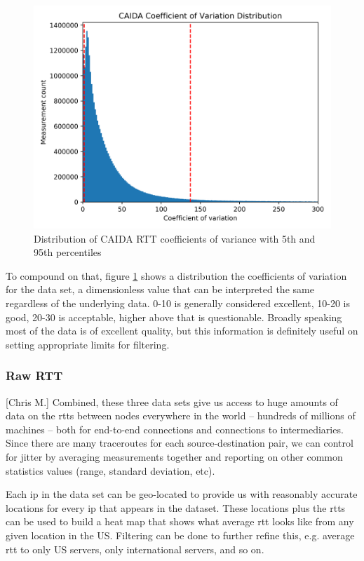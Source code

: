 \documentclass[12pt]{article}
\begin{document}
\begin{figure}[H]
    \centering
    \includegraphics[width=\textwidth]{images/CAIDA_cv_dist.png}
    \caption{Distribution of CAIDA RTT coefficients of variance with 5th and 95th percentiles} 
    \label{fig:rtt_cv_dst}
\end{figure}

To compound on that, figure \ref{fig:rtt_cv_dst} shows a distribution the coefficients of variation for the data set, a dimensionless value that can be interpreted the same regardless of the underlying data. 0-10 is generally considered excellent, 10-20 is good, 20-30 is acceptable, higher above that is questionable. Broadly speaking most of the data is of excellent quality, but this information is definitely useful on setting appropriate limits for filtering.

\subsubsection{Raw RTT}[Chris M.]
Combined, these three data sets give us access to huge amounts of data on the \acrshort{rtt}s between nodes everywhere in the world -- hundreds of millions of machines -- both for end-to-end connections and connections to intermediaries. Since there are many traceroutes for each source-destination pair, we can control for jitter by averaging measurements together and reporting on other common statistics values (range, standard deviation, etc).

Each \acrshort{ip} in the data set can be geo-located to provide us with reasonably accurate locations for every \acrshort{ip} that appears in the dataset. These locations plus the \acrshort{rtt}s can be used to build a heat map that shows what average \acrshort{rtt} looks like from any given location in the US. Filtering can be done to further refine this, e.g. average \acrshort{rtt} to only US servers, only international servers, and so on.
\end{document}
